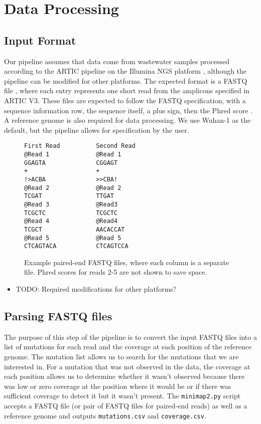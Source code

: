 \documentclass{article}
\newenvironment{tightemize}
{ \begin{itemize}
    \setlength{\itemsep}{0pt}
    \setlength{\parskip}{0pt}
    \setlength{\parsep}{0pt}     }
{ \end{itemize}                  }
\begin{document}
\section{Data Processing}

\subsection{Input Format}

Our pipeline assumes that data come from wastewater samples processed according to the ARTIC pipeline \citep{needed} on the Illumina NGS platform \citep{needed}, although the pipeline can be modified for other platforms.
The expected format is a FASTQ file \citep{needed}, where each entry represents one short read from the amplicons specified in ARTIC V3. %
These files are expected to follow the FASTQ specification, with a sequence information row, the sequence itself, a plus sign, then the Phred score \citep{needed}.
A reference genome is also required for data processing.
We use Wuhan-1 \citep{needed} as the default, but the pipeline allows for specification by the user.


\begin{figure}[h!]
\begin{verbatim}
First Read          Second Read
@Read 1             @Read 1
GGAGTA              CGGAGT
+                   +
!>ACBA              >>CBA!
@Read 2             @Read 2
TCGAT               TTGAT
@Read 3             @Read3  
TCGCTC              TCGCTC
@Read 4             @Read4
TCGCT               AACACCAT
@Read 5             @Read 5
CTCAGTACA           CTCAGTCCA
\end{verbatim}
\caption{Example paired-end FASTQ files, where each column is a separate file.
Phred scores for reads 2-5 are not shown to save space.}
\label{short-reads}
\end{figure}



\begin{tightemize} 
    \item TODO: Required modifications for other platforms?
\end{tightemize}

\subsection{Parsing FASTQ files}

The purpose of this step of the pipeline is to convert the input FASTQ files into a list of mutations for each read and the coverage at each position of the reference genome.
The mutation list allows us to search for the mutations that we are interested in.
For a mutation that was not observed in the data, the coverage at each position allows us to determine whether it wasn't observed because there was low or zero coverage at the position where it would be or if there was sufficient coverage to detect it but it wasn't present.
The \texttt{minimap2.py} script accepts a FASTQ file (or pair of FASTQ files for paired-end reads) as well as a reference genome and outputs \texttt{mutations.csv} and \texttt{coverage.csv}.
\end{document}
